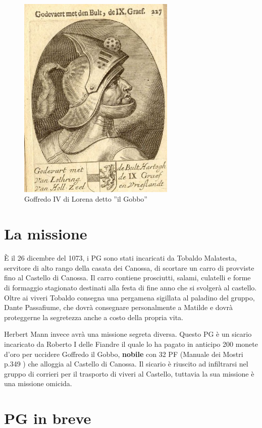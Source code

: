 \documentclass[letterpaper,twocolumn,openany,nodeprecatedcode]{dndbook}
\begin{document}
\begin{figure}
\centering
\includegraphics[width=7.5cm]{img/goffredo-il-gobbo.png}
    \caption{\textsf{Goffredo IV di Lorena detto ''il Gobbo''}}
    \label{fig:goffredo}
\end{figure}

\section{La missione}
È il 26 dicembre del 1073, i PG sono stati incaricati da Tobaldo Malatesta, servitore di alto rango della casata dei Canossa, di scortare un carro di provviste fino al Castello di Canossa. Il carro contiene prosciutti, salami, culatelli e forme di formaggio stagionato destinati alla festa di fine anno che si svolgerà al castello. Oltre ai viveri Tobaldo consegna una pergamena sigillata al paladino del gruppo, Dante Passafiume, che dovrà consegnare personalmente a Matilde e dovrà proteggerne la segretezza anche a costo della propria vita.

Herbert Mann invece avrà una missione segreta diversa. Questo PG è un sicario incaricato da Roberto I delle Fiandre il quale lo ha pagato in anticipo 200 monete d'oro per uccidere Goffredo il Gobbo, \textbf{nobile} con 32 PF (Manuale dei Mostri p.349 \cite{dnd:mostri}) che alloggia al Castello di Canossa. Il sicario è riuscito ad infiltrarsi nel gruppo di corrieri per il trasporto di viveri al Castello, tuttavia la sua missione è una missione omicida.


\section{PG in breve}
\end{document}
